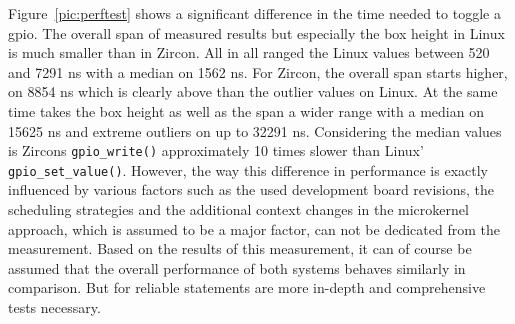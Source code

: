 Figure~\ref{pic:perftest} shows a significant difference in the time needed to toggle a \ac{gpio}.
The overall span of measured results but especially the box height in Linux is much smaller than in Zircon.
All in all ranged the Linux values between 520 and 7291 ns with a median on 1562 ns.
For Zircon, the overall span starts higher, on 8854 ns which is clearly above than the outlier values on Linux.
At the same time takes the box height as well as the span a wider range with a median on 15625 ns and extreme outliers on up to 32291 ns.
Considering the median values is Zircons \texttt{gpio_write()} approximately 10 times slower than Linux' \texttt{gpio_set_value()}.
However, the way this difference in performance is exactly influenced by various factors such as the used development board revisions, the scheduling strategies and the additional context changes in the microkernel approach, which is assumed to be a major factor, can not be dedicated from the measurement.
Based on the results of this measurement, it can of course be assumed that the overall performance of both systems behaves similarly in comparison.
But for reliable statements are more in-depth and comprehensive tests necessary.

